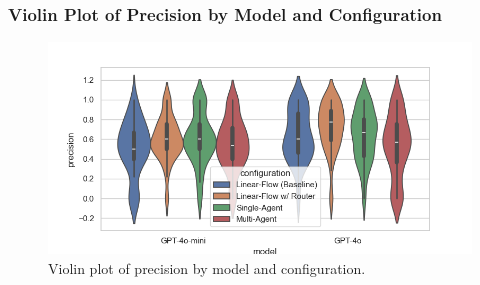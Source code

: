             \subsubsection{Violin Plot of Precision by Model and Configuration}
            \begin{figure}[H]
                \centering
                \includegraphics[scale=0.75]{images_exp2/precision/violin_precision_by_model_and_configuration.png}
                \caption{Violin plot of precision by model and configuration.}
                \label{fig:violin_precision_by_model_and_configuration}
            \end{figure}





            



        